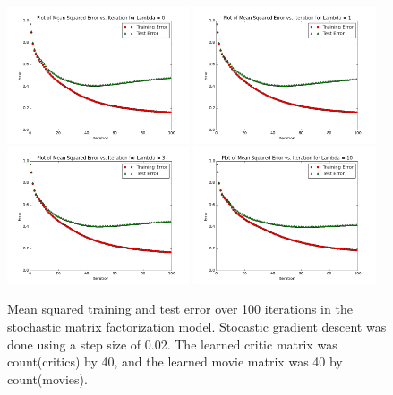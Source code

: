 \documentclass[12pt]{article}
\begin{document}
	\begin{figure}[H]
	\centering
	\includegraphics[width=0.48\textwidth]{plots/test-i100d40l0.png}
	\includegraphics[width=0.48\textwidth]{plots/test-i100d40l1.png}
	\includegraphics[width=0.48\textwidth]{plots/test-i100d40l3.png}
	\includegraphics[width=0.48\textwidth]{plots/test-i100d40l10.png}
	\caption{Mean squared training and test error over 100 iterations in the stochastic matrix factorization model. Stocastic gradient descent was done using a step size of 0.02. The learned critic matrix was count(critics) by 40, and the learned movie matrix was 40 by count(movies).}
	\label{fig:40}
	\end{figure}
\end{document}
